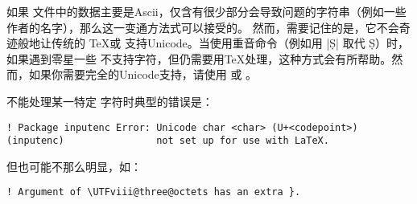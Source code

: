 如果  文件中的数据主要是Ascii，仅含有很少部分会导致问题的字符串（例如一些作者的名字），那么这一变通方法式可以接受的。
然而，需要记住的是，它不会奇迹般地让传统的 \TeX 或 \pdfTeX 支持Unicode。当使用重音命令（例如用 |\d{S}| 取代 \d{S}）时，如果遇到零星一些 不支持字符，但仍需要用\TeX 处理，这种方式会有所帮助。然而，如果你需要完全的Unicode支持，请使用 \XeTeX 或 \LuaTeX 。

 不能处理某一特定 \utf 字符时典型的错误是：

\begin{verbatim}
! Package inputenc Error: Unicode char <char> (U+<codepoint>)
(inputenc)                not set up for use with LaTeX.
\end{verbatim}
%
但也可能不那么明显，如：

\begin{verbatim}
! Argument of \UTFviii@three@octets has an extra }.
\end{verbatim}

\endinput
